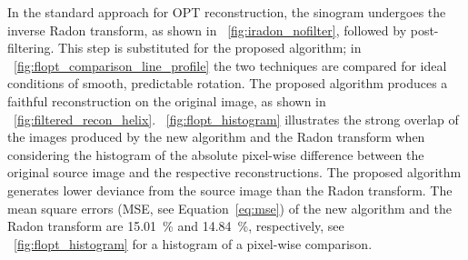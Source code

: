 \documentclass{osa-article}
\begin{document}
In the standard approach for OPT reconstruction, the sinogram undergoes the inverse Radon transform, as shown in \figurename~\ref{fig:iradon_nofilter}, followed by post-filtering.
This step is substituted for the proposed algorithm; in \figurename~\ref{fig:flopt_comparison_line_profile} the two techniques are compared for ideal conditions of smooth, predictable rotation.
The proposed algorithm produces %
a faithful reconstruction on the original image, as shown in \figurename~\ref{fig:filtered_recon_helix}. %
\figurename~\ref{fig:flopt_histogram} illustrates the strong overlap of the images produced by the new algorithm and the Radon transform when considering the histogram of the absolute pixel-wise difference between the original source image and the respective reconstructions.
The proposed algorithm generates lower deviance from the source image than the Radon transform.
The mean square errors (MSE, see Equation~\eqref{eq:mse}) of the new algorithm and the Radon transform are \SI{15.01}{\percent} and \SI{14.84}{\percent}, respectively, see \figurename~\ref{fig:flopt_histogram} for a histogram of a pixel-wise comparison.
\end{document}
